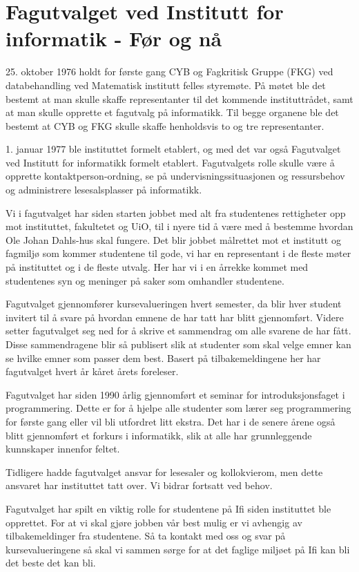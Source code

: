 \chapter[FUI]{Fagutvalget ved Institutt for informatik - Før og nå}

\author{Skrevet av Dennis Norheim}

25. oktober 1976 holdt for første gang CYB og Fagkritisk Gruppe (FKG) ved databehandling ved Matematisk institutt felles styremøte. På møtet ble det bestemt at man skulle skaffe representanter til det kommende instituttrådet, samt at man skulle opprette et fagutvalg på informatikk. Til begge organene ble det bestemt at CYB og FKG skulle skaffe henholdsvis to og tre representanter. 

1. januar 1977 ble instituttet formelt etablert, og med det var også Fagutvalget ved Institutt for informatikk formelt etablert. Fagutvalgets rolle skulle være å opprette kontaktperson-ordning, se på undervisningssituasjonen og ressursbehov og administrere lesesalsplasser på informatikk.

Vi i fagutvalget har siden starten jobbet med alt fra studentenes rettigheter opp mot instituttet, fakultetet og UiO, til i nyere tid å være med å bestemme hvordan Ole Johan Dahls-hus skal fungere. Det blir jobbet målrettet mot et institutt og fagmiljø som kommer studentene til gode, vi har en representant i de fleste møter på instituttet og i de fleste utvalg. Her har vi i en årrekke kommet med studentenes syn og meninger på saker som omhandler studentene. 

Fagutvalget gjennomfører kursevalueringen hvert semester, da blir hver student invitert til å svare på hvordan emnene de har tatt har blitt gjennomført. Videre setter fagutvalget seg ned for å skrive et sammendrag om alle svarene de har fått. Disse sammendragene blir så publisert slik at studenter som skal velge emner kan se hvilke emner som passer dem best. Basert på tilbakemeldingene her har fagutvalget hvert år kåret årets foreleser. 

Fagutvalget har siden 1990 årlig gjennomført  et seminar for introduksjonsfaget i programmering. Dette er for å hjelpe alle studenter som lærer seg programmering for første gang eller vil bli utfordret litt ekstra. Det har i de senere årene også blitt gjennomført et forkurs i informatikk, slik at alle har grunnleggende kunnskaper innenfor feltet. 

Tidligere hadde fagutvalget ansvar for lesesaler og kollokvierom, men dette ansvaret har instituttet tatt over. Vi bidrar fortsatt ved behov.

Fagutvalget har spilt en viktig rolle for studentene på Ifi siden instituttet ble opprettet. For at vi skal gjøre jobben vår best mulig er vi avhengig av tilbakemeldinger fra studentene. Så ta kontakt med oss og svar på kursevalueringene så skal vi sammen sørge for at det faglige miljøet på Ifi kan bli det beste det kan bli.
